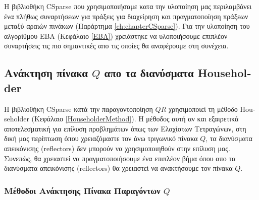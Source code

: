 Η βιβλιοθήκη \textlatin{CSparse} που χρησιμοποιήσαμε κατα την υλοποίηση μας περιλαμβάνει ένα πλήθως συναρτήσεων για πράξεις για διαχείρηση και πραγματοποίηση πράξεων μεταξύ αραιών πινάκων (Παράρτημα \ref{ch:chapterCSparse}). Για την υλοποίηση του αλγορίθμου \textlatin{EBA} (Κεφάλαιο \ref{EBA}) χρειάστηκε να υλοποιήσουμε επιπλέον συναρτήσεις τις πιο σημαντικές απο τις οποίες θα αναφέρουμε στη συνέχεια.

\subsection{Ανάκτηση πίνακα $Q$ απο τα διανύσματα \textlatin{Householder}}

Η βιβλιοθήκη \textlatin{CSparse} κατά την παραγοντοποίηση $QR$ χρησιμοποιεί τη μέθοδο \textlatin{Householder} (Κεφάλαιο \ref{HouseholderMethod}). Η μέθοδος αυτή αν και εξαιρετικά αποτελεσματική για επίλυση προβλημάτων όπως των Ελαχίστων Τετραγώνων, στη δική μας περίπτωση όπου χρειαζόμαστε τον άνω τριγωνικό πίνακα $Q$, τα διανύσματα απεικόνισης (\textlatin{reflectors}) δεν μπορούν να χρησιμοποιηθούν στην επίλυση μας. Συνεπώς, θα χρειαστεί να πραγματοποιήσουμε ένα επιπλέον βήμα όπου απο τα διανύσματα απεικόνισης (\textlatin{reflectors}) θα χρειαστεί να ανακτήσουμε τον πίνακα $Q$.

\subsubsection{Μέθοδοι Ανάκτησης Πίνακα Παραγόντων $Q$}


